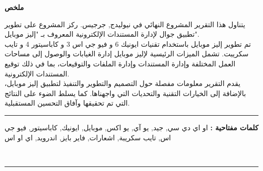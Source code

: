 \documentclass[a4paper,12pt]{report}
\begin{document}
\begin{center}
  \begin{Arabic}
    \textbf{ملخص}
  \end{Arabic}
\end{center}


\begin{Arabic}
  \par
  يتناول هذا التقرير المشروع النهائي في نيوليدج, جرجيس. ركز المشروع على تطوير تطبيق جوال لإدارة المستندات الإلكترونية المعروف بـ "إليز موبايل".\\
تم تطوير إليز موبايل باستخدام تقنيات ايونيك 6 و فيو جي اس 3 و كاباسيتور 4 و تايب سكريبت.
تشمل الميزات الرئيسية لإليز موبايل إدارة الغيابات والوصول إلى مساحات العمل المختلفة وإدارة المستندات وإدارة الملفات والتوقيعات، بما في ذلك توقيع المستندات الإلكترونية.\\
يقدم التقرير معلومات مفصلة حول التصميم والتطوير والتنفيذ لتطبيق إليز موبايل، بالإضافة إلى الخيارات التقنية والتحديات التي واجهناها. كما يسلط الضوء على النتائج التي تم تحقيقها وآفاق التحسين المستقبلية.
  
\end{Arabic}

\noindent\rule[2pt]{\textwidth}{0.5pt}

\begin{Arabic}

{\textbf{كلمات مفتاحية :}}
او اي دي سي, جيد, يو آي, يو اكس, موبايل, ايونيك, كاباسيتور, فيو جي اس, تايب سكريبة, اشعارات, فاير بايز, اندرويد, اي او اس
\end{Arabic}
\\
\noindent\rule[2pt]{\textwidth}{0.5pt}

\endgroup
\end{document}
